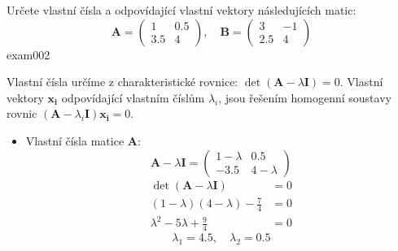 \begin{mathexam}{Určete vlastní čísla a odpovídající vlastní vektory následují\-cích matic:
  \begin{equation*}
    \mathbf{A}=
      \begin{pmatrix}
        1   & 0.5\\
        3.5 & 4
      \end{pmatrix}, \quad
    \mathbf{B}=
      \begin{pmatrix}
        3   & -1 \\
        2.5 &  4 
      \end{pmatrix}
  \end{equation*}
  }{exam002}

  Vlastní čísla určíme z charakteristické rovnice: \(\det(\mathbf{A} - \lambda\mathbf{I}) = 0\).
  Vlastní vektory \(\mathbf{x_i}\) odpovídající vlastním číslům \(\lambda_i\), jsou řešením
  homogenní soustavy rovnic \((\mathbf{A} - \lambda_i\mathbf{I})\mathbf{x_i} = 0\).
  \begin{itemize}
    \item Vlastní čísla matice \textbf{A}:
      \begin{equation*}
          \textbf{A} - \lambda\textbf{I} =
            \begin{pmatrix}
                1-\lambda  &  0.5          \\
              -3.5         &  4-\lambda
            \end{pmatrix}
      \end{equation*}
      \begin{align*}
        \det(\mathbf{A}-\lambda\mathbf{I}) &= 0 \\
        (1-\lambda)(4-\lambda)-\frac{7}{4} &= 0 \\
        \lambda^2-5\lambda+\frac{9}{4}     &= 0
      \end{align*}
      \begin{equation*}
        \lambda_1 = 4.5,\quad \lambda_2 = 0.5
      \end{equation*}
  \end{itemize}


\end{mathexam}
